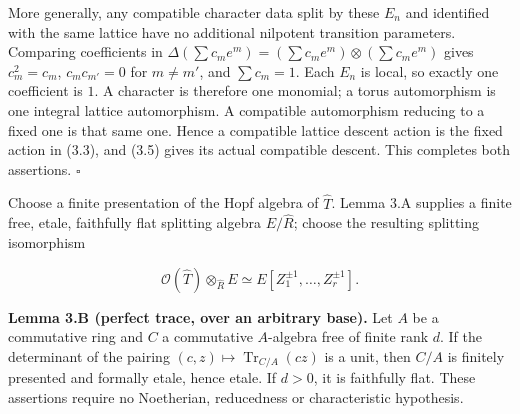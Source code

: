 \documentclass[11pt,a4paper,openany]{report}
\begin{document}
More generally, any compatible character data split by these \(E_n\) and identified with the same lattice have no additional nilpotent transition parameters. Comparing coefficients in \(\Delta(\sum c_me^m)=(\sum c_me^m)\otimes(\sum c_me^m)\) gives \(c_m^2=c_m\), \(c_mc_{m'}=0\) for \(m\ne m'\), and \(\sum c_m=1\). Each \(E_n\) is local, so exactly one coefficient is \(1\). A character is therefore one monomial; a torus automorphism is one integral lattice automorphism. A compatible automorphism reducing to a fixed one is that same one. Hence a compatible lattice descent action is the fixed action in (3.3), and (3.5) gives its actual compatible descent. This completes both assertions. \(\square\)

Choose a finite presentation of the Hopf algebra of \(\widehat T\). Lemma 3.A supplies a finite free, etale, faithfully flat splitting algebra \(E/\widehat R\); choose the resulting splitting isomorphism

\[
\mathcal O(\widehat T)\otimes_{\widehat R}E
\simeq E[Z_1^{\pm1},\ldots,Z_r^{\pm1}].
\tag{3.1}
\]

\label{AG-RG-S05-finite-free-perfect-trace}

\textbf{Lemma 3.B (perfect trace, over an arbitrary base).} Let \(A\) be a commutative ring and \(C\) a commutative \(A\)-algebra free of finite rank \(d\). If the determinant of the pairing \((c,z)\mapsto\operatorname{Tr}_{C/A}(cz)\) is a unit, then \(C/A\) is finitely presented and formally etale, hence etale. If \(d>0\), it is faithfully flat. These assertions require no Noetherian, reducedness or characteristic hypothesis.
\end{document}
